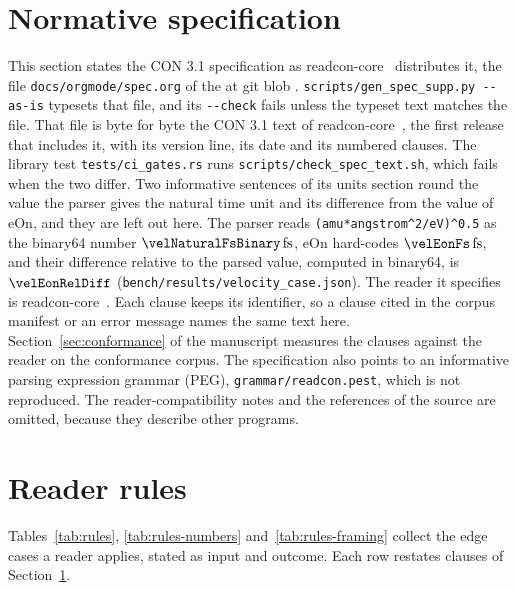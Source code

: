 \documentclass[preprint,12pt]{elsarticle}
\begin{document}
\section{Normative specification}\label{sec:spec-normative} This section states the CON 3.1 specification as readcon-core~\readconversion{} distributes it, the file \texttt{docs/\allowbreak orgmode/\allowbreak spec.org} of the \readconcommitrole{} \texttt{\readconcommitshort} at git blob \texttt{\specTextBlob}.
\texttt{scripts/\allowbreak gen\_spec\_supp.py -{}-as-is} typesets that file, and its \texttt{-{}-check} fails unless the typeset text matches the file.
That file is byte for byte the CON 3.1 text of readcon-core~\specTextRelease{}, the first release that includes it, with its version line, its date and its \specClauses{} numbered clauses.
The library test \texttt{tests/\allowbreak ci\_gates.rs} runs \texttt{scripts/\allowbreak check\_spec\_text.sh}, which fails when the two differ.
Two informative sentences of its units section round the value the parser gives the natural time unit and its difference from the value of eOn, and they are left out here.
The parser reads \texttt{(amu*angstrom\^{}2/eV)\^{}0.5} as the binary64 number \(\velNaturalFsBinary\,\mathrm{fs}\), eOn hard-codes \(\velEonFs\,\mathrm{fs}\), and their difference relative to the parsed value, computed in binary64, is \(\velEonRelDiff\) (\texttt{bench/\allowbreak results/\allowbreak velocity\_case.json}).
The reader it specifies is readcon-core~\readconversion{}.
Each clause keeps its identifier, so a clause cited in the corpus manifest or an error message names the same text here.
Section~\ref{sec:conformance} of the manuscript measures the clauses against the reader on the conformance corpus.
The specification also points to an informative parsing expression grammar (PEG), \texttt{grammar/\allowbreak readcon.pest}, which is not reproduced.
The reader-compatibility notes and the references of the source are omitted, because they describe other programs.



  

\FloatBarrier \section{Reader rules}\label{sec:appendix-rules} Tables~\ref{tab:rules}, \ref{tab:rules-numbers} and~\ref{tab:rules-framing} collect the edge cases a reader applies, stated as input and outcome.
Each row restates clauses of Section~\ref{sec:spec-normative}.
\end{document}
